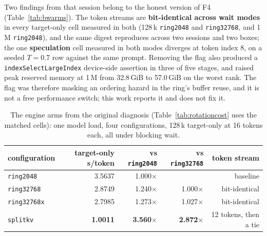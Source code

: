 \documentclass{article}
\begin{document}
Two findings from that session belong to the honest version of F4 (Table~\ref{tab:bwarms}).
The token streams are \textbf{bit-identical across wait modes} in every target-only cell
measured in both (128\,k \texttt{ring2048} and \texttt{ring32768}, and 1\,M
\texttt{ring2048}), and the same digest reproduces across two sessions and two boxes; the one
\textbf{speculation} cell measured in both modes diverges at token index 8, on a seeded
$T{=}0.7$ row against the same prompt. Removing the flag also produced a \texttt{indexSelectLargeIndex} device-side assertion
in three of five stages, and raised peak reserved memory at 1\,M from 32.8\,GiB to 57.0\,GiB
on the worst rank. The flag was therefore masking an ordering hazard in the ring's buffer
reuse, and it is not a free performance switch; this work reports it and does not fix it.


\begin{table}[h]
\centering\footnotesize
\caption{What the rotation costs per rung, target-only arms on matched cells, measured under
blocking wait (Table~\ref{tab:headline}). The last column divides the removed time by the 224
rounds per decode token. The removed time grows with the shard the rotation ships, 4$\times$
at 512\,k and 8$\times$ at 1\,M. Removing the flag accounts for about 70\% of the 128\,k
figure and only about 3\% of the 1\,M figure; the rest is the rotation's own work, part of
which the measured transfer explains and part of which is not attributed here.}
\label{tab:rotationcost}

\end{table}

\begin{table}[h]
\centering\footnotesize
\caption{The engine arms from the original diagnosis (Table~\ref{tab:rotationcost} uses the
matched cells): one model load, four configurations, 128\,k target-only at 16 tokens each, all
under blocking wait.}
\label{tab:arms}
\begin{tabular}{lrrrr}
\toprule
configuration & target-only s/token & vs \texttt{ring2048} & vs \texttt{ring32768} & token stream \\
\midrule
\texttt{ring2048}   & 3.5637 & 1.000$\times$ & & baseline \\
\texttt{ring32768}  & 2.8749 & 1.240$\times$ & 1.000$\times$ & bit-identical \\
\texttt{ring32768x} & 2.7985 & 1.273$\times$ & 1.027$\times$ & bit-identical \\
\texttt{splitkv}    & \textbf{1.0011} & \textbf{3.560$\times$} & \textbf{2.872$\times$} & 12 tokens, then a tie \\
\bottomrule
\end{tabular}
\end{table}
\end{document}
